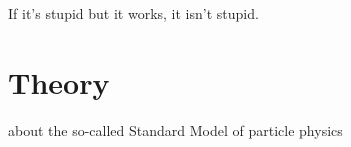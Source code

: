 \begin{savequote}[75mm]
If it's stupid but it works, it isn't stupid.
\end{savequote}

\chapter{Theory}

 about the so-called Standard Model of particle physics



